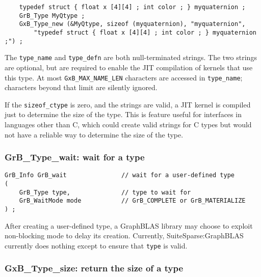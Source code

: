 \documentclass[12pt]{article}
\begin{document}
    {\footnotesize
    \begin{verbatim}
    typedef struct { float x [4][4] ; int color ; } myquaternion ;
    GrB_Type MyQtype ;
    GxB_Type_new (&MyQtype, sizeof (myquaternion), "myquaternion",
        "typedef struct { float x [4][4] ; int color ; } myquaternion ;") ; \end{verbatim}}

The \verb'type_name' and \verb'type_defn' are both null-terminated strings.
The two strings are optional, but are
required to enable the JIT compilation of kernels that use this type.
At most \verb'GxB_MAX_NAME_LEN' characters are accessed in \verb'type_name';
characters beyond that limit are silently ignored.

If the \verb'sizeof_ctype' is zero, and the strings are valid, a
JIT kernel is compiled just to determine the size of the type.  This is
feature useful for interfaces in languages other than C, which could create
valid strings for C types but would not have a reliable way to determine the
size of the type.

\subsubsection{{\sf GrB\_Type\_wait:} wait for a type}
\label{type_wait}

\begin{mdframed}[userdefinedwidth=6in]
{\footnotesize
\begin{verbatim}
GrB_Info GrB_wait               // wait for a user-defined type
(
    GrB_Type type,              // type to wait for
    GrB_WaitMode mode           // GrB_COMPLETE or GrB_MATERIALIZE
) ;
\end{verbatim}
}\end{mdframed}

After creating a user-defined type, a GraphBLAS library may choose to exploit
non-blocking mode to delay its creation.  Currently, SuiteSparse:GraphBLAS
currently does nothing except to ensure that \verb'type' is valid.

\subsubsection{{\sf GxB\_Type\_size:} return the size of a type}
\label{type_size}
\end{document}
